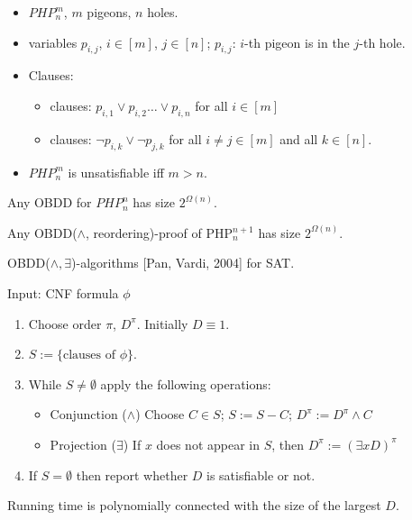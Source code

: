 {
\begin{itemize}
\item $PHP^m_n$, $m$ pigeons, $n$ holes.
\item variables $p_{i, j}$, $i \in [m]$, $j \in [n]$;
$p_{i, j}$: $i$-th pigeon is in the $j$-th hole.
\item Clauses:
\begin{itemize}
\item {} clauses:
$p_{i, 1} \lor p_{i, 2} \dots \lor p_{i, n}$ for all $i \in [m]$
\item {} clauses: $\lnot p_{i, k} \lor \lnot p_{j, k}$ for all $i \neq j
\in [m]$ and all $k \in [n]$.
\end{itemize}
\item $PHP^m_n$ is unsatisfiable iff $m>n$.
\end{itemize}

\pause \mylem Any OBDD for $PHP^n_n$ has size $2^{\Omega(n)}$.

\pause \myth Any OBDD($\land$, reordering)-proof of PHP$^{n+1}_n$ has size $2^{\Omega(n)}$.
}





{
OBDD($\land, \exists$)-algorithms [Pan, Vardi, 2004] for SAT.

Input: CNF formula $\phi$
\begin{enumerate}
\item Choose order $\pi$, $D^\pi$. Initially $D\equiv 1$.
\item $S:=\{\mbox{clauses of }\phi\}$.
\item While $S\neq \emptyset$ apply the following operations:
\begin{itemize}
\item Conjunction ($\land$)  Choose $C\in S$; $S:=S-C$; $D^{\pi}:=D^{\pi} \land C$
\item Projection ($\exists$) If $x$ does not appear in $S$, then $D^{\pi}:=(\exists x D)^{\pi}$
\end{itemize}
\item If $S=\emptyset$ then report whether $D$ is satisfiable or not.
\end{enumerate}

Running time is polynomially connected with the size of the largest $D$.
}

